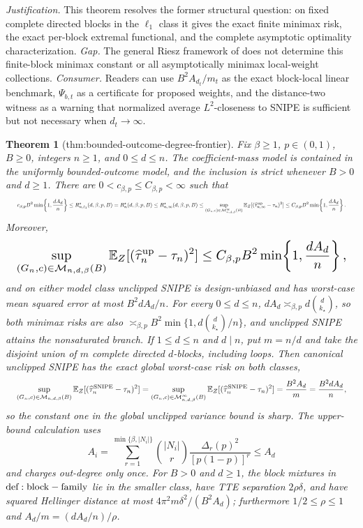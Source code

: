 \documentclass{article}
\newtheorem{theorem}{Theorem}
\begin{document}
\par\smallskip\noindent \textit{Justification.} This theorem resolves the former structural question: on fixed complete directed blocks in the \(\ell_1\) class it gives the exact finite minimax risk, the exact per-block extremal functional, and the complete asymptotic optimality characterization. \textit{Gap.} The general Riesz framework of \cite{HarshawSavjeWang2025} does not determine this finite-block minimax constant or all asymptotically minimax local-weight collections. \textit{Consumer.} Readers can use \(B^2A_{d_t}/m_t\) as the exact block-local linear benchmark, \(\Psi_{b,t}\) as a certificate for proposed weights, and the distance-two witness as a warning that normalized average \(L^2\)-closeness to SNIPE is sufficient but not necessary when \(d_t\to\infty\).

\begin{theorem}[thm:bounded-outcome-degree-frontier]\label{thm:bounded-outcome-degree-frontier}
Fix \(\beta\ge1\), \(p\in(0,1)\), \(B\ge0\), integers \(n\ge1\), and \(0\le d\le n\). The coefficient-mass model is contained in the uniformly bounded-outcome model, and the inclusion is strict whenever \(B>0\) and \(d\ge1\). There are \(0<c_{\beta,p}\le C_{\beta,p}<\infty\) such that
\[
\makebox[\linewidth][c]{\resizebox{0.98\linewidth}{!}{\(\displaystyle c_{\beta,p}B^2\min\!\left\{1,\frac{dA_d}{n}\right\}
\le R_{n,\ell_1}^\star(d,\beta,p,B)=R_n^\star(d,\beta,p,B)
\le R_{n,\infty}^\star(d,\beta,p,B)
\le \sup_{(G_n,c)\in\mathcal M_{n,d,\beta}^{\infty}(B)}
\mathbb E_Z[(\widehat\tau_{n,\infty}^{\mathrm{up}}-\tau_n)^2]
\le C_{\beta,p}B^2\min\!\left\{1,\frac{dA_d}{n}\right\}.\)}}
\]
Moreover,
\[
\makebox[\linewidth][c]{\resizebox{0.98\linewidth}{!}{\(\displaystyle \sup_{(G_n,c)\in\mathcal M_{n,d,\beta}(B)}
\mathbb E_Z[(\widehat\tau_n^{\mathrm{up}}-\tau_n)^2]
\le C_{\beta,p}B^2\min\!\left\{1,\frac{dA_d}{n}\right\},\)}}
\]
and on either model class unclipped SNIPE is design-unbiased and has worst-case mean squared error at most \(B^2dA_d/n\). For every \(0\le d\le n\), \(dA_d\asymp_{\beta,p}d\binom d{k_\star}\), so both minimax risks are also \(\asymp_{\beta,p}B^2\min\{1,d\binom d{k_\star}/n\}\), and unclipped SNIPE attains the nonsaturated branch. If \(1\le d\le n\) and \(d\mid n\), put \(m=n/d\) and take the disjoint union of \(m\) complete directed \(d\)-blocks, including loops. Then canonical unclipped SNIPE has the exact global worst-case risk on both classes,
\[
\makebox[\linewidth][c]{\resizebox{0.98\linewidth}{!}{\(\displaystyle \sup_{(G_n,c)\in\mathcal M_{n,d,\beta}(B)}\mathbb E_Z[(\widehat\tau_n^{\mathrm{SNIPE}}-\tau_n)^2]
=\sup_{(G_n,c)\in\mathcal M_{n,d,\beta}^{\infty}(B)}\mathbb E_Z[(\widehat\tau_n^{\mathrm{SNIPE}}-\tau_n)^2]
=\frac{B^2A_d}{m}=\frac{B^2dA_d}{n},\)}}
\]
so the constant one in the global unclipped variance bound is sharp. The upper-bound calculation uses
\[
A_i=\sum_{r=1}^{\min\{\beta,|N_i|\}}\binom{|N_i|}{r}\frac{\Delta_r(p)^2}{[p(1-p)]^r}\le A_d
\]
and charges out-degree only once. For \(B>0\) and \(d\ge1\), the block mixtures in \({\rm def:block-family}\) lie in the smaller class, have TTE separation \(2\rho\delta\), and have squared Hellinger distance at most \(4\pi^2m\delta^2/(B^2A_d)\); furthermore \(1/2\le\rho\le1\) and \(A_d/m=(dA_d/n)/\rho\).
\end{theorem}
\end{document}
